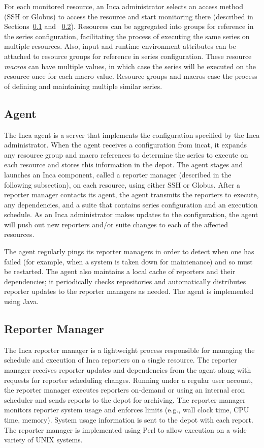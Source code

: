 \documentclass{sig-alternate}
\begin{document}
For each monitored resource, an Inca administrator selects an access method
(SSH or Globus) to access the resource and start monitoring there (described
in Sections~\ref{agent} and ~\ref{rm}).  Resources can be aggregated into
groups for reference in the series configuration, facilitating the
process of executing the same series on multiple resources.  Also,
input and runtime environment attributes can be attached to resource groups
for reference in series configuration.
These resource \emph{macros} can have multiple values, in which
case the series will be executed on the resource once for each macro value.
Resource groups and macros ease the process of defining and maintaining
multiple similar series.

\subsection{Agent}
\label{agent}

The Inca agent is a server that implements the configuration specified by the
Inca administrator.  When the agent receives a configuration from incat,
it expands any resource group and macro references to determine
the series to execute on each resource and stores this
information in the depot.  The agent stages and
launches an Inca component, called a reporter manager (described in the
following subsection), on each resource, using either SSH or Globus.  After a
reporter manager contacts its agent, the agent transmits the reporters to
execute, any dependencies, and a suite that contains series
configuration and an execution schedule.  As an Inca administrator makes
updates to the configuration, the agent will push out new reporters and/or
suite changes to each of the affected resources.

The agent regularly pings its reporter managers in order to detect when one has
failed (for example, when a system is taken down for maintenance) and so must
be restarted.  The agent also maintains a local cache of reporters and their
dependencies; it periodically checks repositories
and automatically distributes reporter updates to the reporter managers as
needed.  The agent is implemented using Java. 

\subsection{Reporter Manager}
\label{rm}

The Inca reporter manager is a lightweight process responsible for managing
the schedule and execution of Inca reporters on a single resource. The
reporter manager receives reporter updates and dependencies from the agent
along with requests for reporter scheduling changes.  Running under a regular
user account, the reporter manager executes reporters on-demand or using an
internal cron scheduler and sends reports to the depot for archiving. The
reporter manager monitors reporter system usage 
and enforces limits (e.g., wall clock time, CPU time, memory).
System usage information is sent to the depot with each report. 
The reporter manager is implemented using Perl to allow execution on
a wide variety of UNIX systems.
\end{document}
